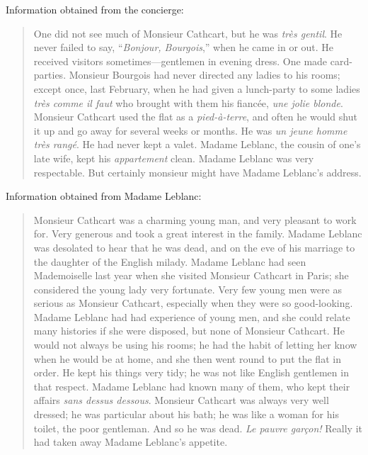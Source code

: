 Information obtained from the concierge:
\begin{quote}
One did not see much of Monsieur Cathcart, but he was \foreignlanguage{french}{\textit{très gentil}}.  He never failed to say, \foreignquote{french}{\textit{Bonjour, Bourgois},} when he came in or out. He received visitors sometimes—gentlemen in evening dress. One made card-parties. Monsieur Bourgois had never directed any ladies to his rooms; except once, last February, when he had given a lunch-party to some ladies \textit{très comme il faut} who brought with them his fiancée, \foreignlanguage{french}{\textit{une jolie blonde}}. Monsieur Cathcart used the flat as a \foreignlanguage{french}{\textit{pied-à-terre}}, and often he would shut it up and go away for several weeks or months. He was \foreignlanguage{french}{\textit{un jeune homme très rangé}}. He had never kept a valet. Madame Leblanc, the cousin of one's late wife, kept his \textit{appartement} clean. Madame Leblanc was very respectable. But certainly monsieur might have Madame Leblanc's address.
\end{quote}

Information obtained from Madame Leblanc:

\begin{quote}
Monsieur Cathcart was a charming young man, and very pleasant to work for. Very generous and took a great interest in the family. Madame Leblanc was desolated to hear that he was dead, and on the eve of his marriage to the daughter of the English milady. Madame Leblanc had seen Mademoiselle last year when she visited Monsieur Cathcart in Paris; she considered the young lady very fortunate. Very few young men were as serious as Monsieur Cathcart, especially when they were so good-looking. Madame Leblanc had had experience of young men, and she could relate many histories if she were disposed, but none of Monsieur Cathcart. He would not always be using his rooms; he had the habit of letting her know when he would be at home, and she then went round to put the flat in order. He kept his things very tidy; he was not like English gentlemen in that respect. Madame Leblanc had known many of them, who kept their affairs \foreignlanguage{french}{\textit{sans dessus dessous}}. Monsieur Cathcart was always very well dressed; he was particular about his bath; he was like a woman for his toilet, the poor gentleman. And so he was dead. \foreignlanguage{french}{\textit{Le pauvre garçon!}} Really it had taken away Madame Leblanc's appetite.
\end{quote}

